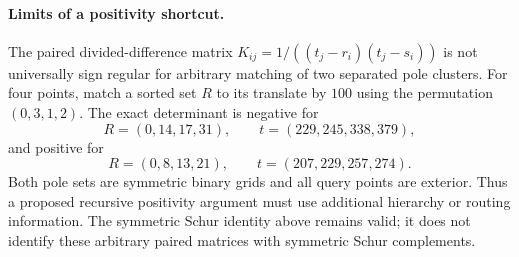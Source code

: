 \documentclass[11pt]{article}
\begin{document}
\paragraph{Limits of a positivity shortcut.}
The paired divided-difference matrix
$K_{ij}=1/((t_j-r_i)(t_j-s_i))$ is not universally sign regular for
arbitrary matching of two separated pole clusters. For four points,
match a sorted set $R$ to its translate by $100$ using the permutation
$(0,3,1,2)$. The exact determinant is negative for
\[
 R=(0,14,17,31),\qquad t=(229,245,338,379),
\]
and positive for
\[
 R=(0,8,13,21),\qquad t=(207,229,257,274).
\]
Both pole sets are symmetric binary grids and all query points are
exterior. Thus a proposed recursive positivity argument must use
additional hierarchy or routing information. The symmetric Schur
identity above remains valid; it does not identify these arbitrary
paired matrices with symmetric Schur complements.
\end{document}
